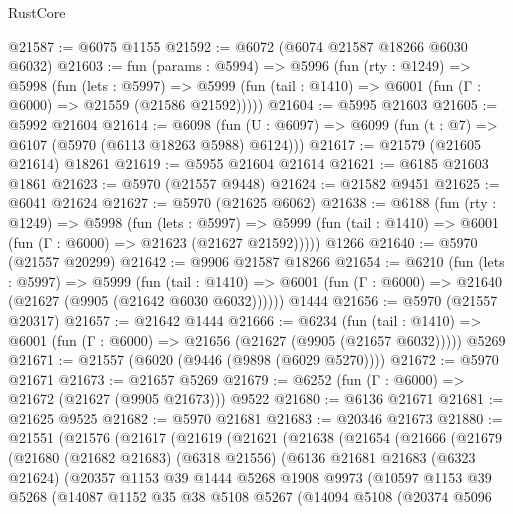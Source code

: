 \begin{lexlean}{RustCore}
\begin{coremodule}
@21587 := @6075 @1155
@21592 := @6072 (@6074 @21587 @18266 @6030 @6032)
@21603 := fun (params : @5994) =>
  @5996
    (fun (rty : @1249) =>
    @5998
      (fun (lets : @5997) =>
      @5999 (fun (tail : @1410) => @6001 (fun (Γ : @6000) => @21559 (@21586 @21592)))))
@21604 := @5995 @21603
@21605 := @5992 @21604
@21614 := @6098
    (fun (U : @6097) => @6099 (fun (t : @7) => @6107 (@5970 (@6113 @18263 @5988) @6124)))
@21617 := @21579 (@21605 @21614) @18261
@21619 := @5955 @21604 @21614
@21621 := @6185 @21603 @1861
@21623 := @5970 (@21557 @9448)
@21624 := @21582 @9451
@21625 := @6041 @21624
@21627 := @5970 (@21625 @6062)
@21638 := @6188
    (fun (rty : @1249) =>
    @5998
      (fun (lets : @5997) =>
      @5999 (fun (tail : @1410) => @6001 (fun (Γ : @6000) => @21623 (@21627 @21592)))))
    @1266
@21640 := @5970 (@21557 @20299)
@21642 := @9906 @21587 @18266
@21654 := @6210
    (fun (lets : @5997) =>
    @5999
      (fun (tail : @1410) =>
      @6001 (fun (Γ : @6000) => @21640 (@21627 (@9905 (@21642 @6030 @6032))))))
    @1444
@21656 := @5970 (@21557 @20317)
@21657 := @21642 @1444
@21666 := @6234
    (fun (tail : @1410) => @6001 (fun (Γ : @6000) => @21656 (@21627 (@9905 (@21657 @6032)))))
    @5269
@21671 := @21557 (@6020 (@9446 (@9898 (@6029 @5270))))
@21672 := @5970 @21671
@21673 := @21657 @5269
@21679 := @6252 (fun (Γ : @6000) => @21672 (@21627 (@9905 @21673))) @9522
@21680 := @6136 @21671
@21681 := @21625 @9525
@21682 := @5970 @21681
@21683 := @20346 @21673
@21880 := @21551
    (@21576
      (@21617
        (@21619
          (@21621
            (@21638
              (@21654
                (@21666
                  (@21679
                    (@21680
                      (@21682 @21683)
                      (@6318 @21556)
                      (@6136
                        @21681
                        @21683
                        (@6323 @21624)
                        (@20357
                          @1153
                          @39
                          @1444
                          @5268
                          @1908
                          @9973
                          (@10597
                            @1153
                            @39
                            @5268
                            (@14087
                              @1152
                              @35
                              @38
                              @5108
                              @5267
                              (@14094
                                @5108
                                (@20374
                                  @5096

\end{coremodule}
\end{lexlean}
